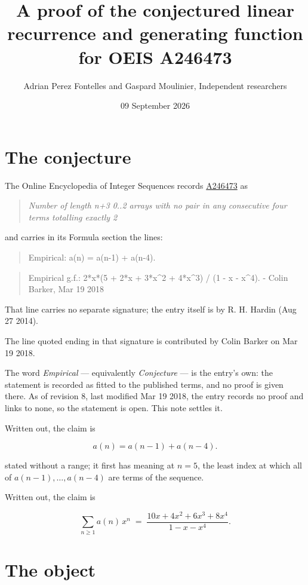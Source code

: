 \documentclass[11pt]{article}
\title{A proof of the conjectured linear recurrence and generating function for OEIS A246473}
\author{Adrian Perez Fontelles and Gaspard Moulinier, Independent researchers}
\date{09 September 2026}
\theoremstyle{definition}
\begin{document}
\maketitle
\section{The conjecture}

The Online Encyclopedia of Integer Sequences records \href{https://oeis.org/A246473}{A246473} as

\begin{quote}\itshape Number of length n+3 0..2 arrays with no pair in any consecutive four terms totalling exactly 2\end{quote}

and carries in its Formula section the lines:

\begin{quote}\ttfamily Empirical: a(n) = a(n-1) + a(n-4).\end{quote}

\begin{quote}\ttfamily Empirical g.f.: 2*x*(5 + 2*x + 3*x\textasciicircum{}2 + 4*x\textasciicircum{}3) / (1 - x - x\textasciicircum{}4). - Colin Barker, Mar 19 2018\end{quote}

That line carries no separate signature; the entry itself is by R. H. Hardin (Aug 27 2014).

The line quoted ending in that signature is contributed by Colin Barker on Mar 19 2018.

The word {\itshape Empirical} --- equivalently {\itshape Conjecture} --- is the entry's own: the statement is recorded as fitted to the published terms, and no proof is given there. As of revision 8, last modified Mar 19 2018, the entry records no proof and links to none, so the statement is open. This note settles it.

Written out, the claim is

\[a(n) = a(n-1) + a(n-4).\]

stated without a range; it first has meaning at $n = 5$, the least index at which all of $a(n-1),\dots,a(n-4)$ are terms of the sequence.

Written out, the claim is

\[\sum_{n \ge 1} a(n)\,x^n \;=\; \frac{10x + 4x^{2} + 6x^{3} + 8x^{4}}{1 - x - x^{4}}.\]

\section{The object}
\end{document}
